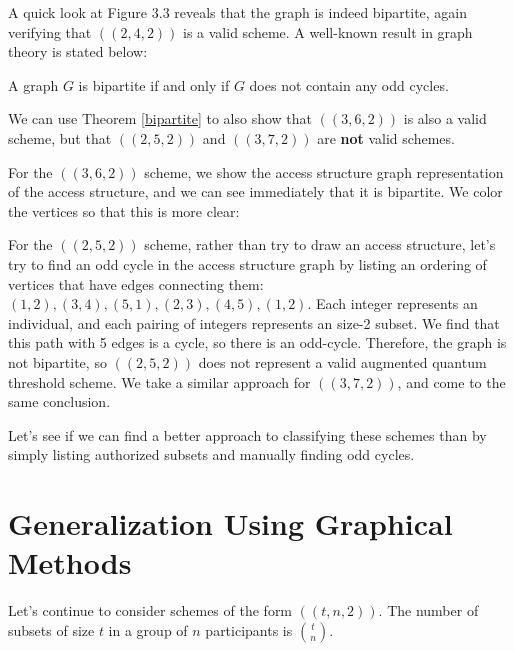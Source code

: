 A quick look at Figure 3.3 reveals that the graph is indeed bipartite, again verifying that $((2,4,2))$ is a valid scheme. A well-known result in graph theory is stated below:

\begin{theorem}
	\label{bipartite}
	A graph $G$ is bipartite if and only if $G$ does not contain any odd cycles.
\end{theorem}

We can use Theorem \ref{bipartite} to also show that $((3,6,2))$ is also a valid scheme, but that $((2,5,2))$ and $((3,7,2))$ are \textbf{not} valid schemes. 

For the $((3,6,2))$ scheme, we show the access structure graph representation of the access structure, and we can see immediately that it is bipartite. We color the vertices so that this is more clear:


For the $((2,5,2))$ scheme, rather than try to draw an access structure, let's try to find an odd cycle in the access structure graph by listing an ordering of vertices that have edges connecting them: $(1,2), (3,4), (5,1), (2,3), (4,5), (1,2)$. Each integer represents an individual, and each pairing of integers represents an size-2 subset. We find that this path with 5 edges is a cycle, so there is an odd-cycle. Therefore, the graph is not bipartite, so $((2,5,2))$ does not represent a valid augmented quantum threshold scheme. We take a similar approach for $((3,7,2))$, and come to the same conclusion.

Let's see if we can find a better approach to classifying these schemes than by simply listing authorized subsets and manually finding odd cycles. 

\section{Generalization Using Graphical Methods}

Let's continue to consider schemes of the form $((t,n,2))$. The number of subsets of size $t$ in a group of $n$ participants is ${t \choose n}$. 


